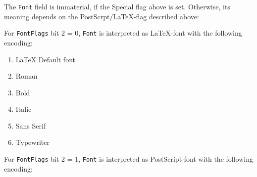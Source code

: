\documentclass[10pt, a4paper, english]{article}%
\begin{document}
The \texttt{Font} field is immaterial, if the Special flag above is set. 
Otherwise, its meaning depends on the PostScrpt/\LaTeX-flag 
described above: 

For \texttt{FontFlags} bit 2 = 0, 
\texttt{Font} is interpreted as \LaTeX-font with the following encoding: 
%
\begin{enumerate}
\item[0] \LaTeX{} Default font
\item    Roman
\item    Bold
\item    Italic
\item    Sans Serif
\item    Typewriter
\end{enumerate}

For \texttt{FontFlags} bit 2 = 1, 
\texttt{Font} is interpreted as PostScript-font with the following encoding: 
\end{document}
